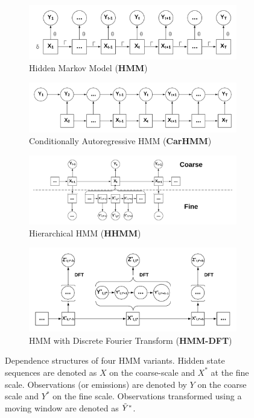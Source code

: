 
\begin{figure}[ht]
    \begin{subfigure}{\textwidth}
      \centering
      \includegraphics[width=4in]{../Plots/HMM.png}  
      \caption{Hidden Markov Model (\textbf{HMM})}
      \label{fig:HMM}
    \end{subfigure}
    \newline
    \begin{subfigure}{\textwidth}
      \centering
      \includegraphics[width=4in]{../Plots/CarHMM.png}  
      \caption{Conditionally Autoregressive HMM (\textbf{CarHMM})}
      \label{fig:CarHMM}
    \end{subfigure}
    \newline
    \begin{subfigure}{\textwidth}
      \centering
      \includegraphics[width=4in]{../Plots/HHMM.png}  
      \caption{Hierarchical HMM (\textbf{HHMM})}
      \label{fig:HHMM}
    \end{subfigure}
    \newline
    \begin{subfigure}{\textwidth}
      \centering
      \includegraphics[width=4in]{../Plots/HMM-DFT.png}  
      \caption{HMM with Discrete Fourier Transform (\textbf{HMM-DFT})}
      \label{fig:HMM-DFT}
    \end{subfigure}
    \caption{Dependence structures of four HMM variants. Hidden state sequences are denoted as $X$ on the coarse-scale and $X^*$ at the fine scale. Observations (or emissions) are denoted by $Y$ on the coarse scale and $Y^*$ on the fine scale. Observations transformed using a moving window are denoted as $\tilde{Y}^*$.}
    \label{fig:models}
\end{figure}

